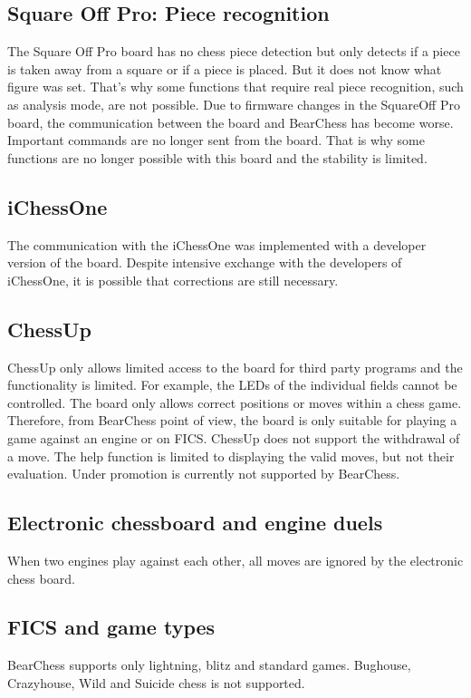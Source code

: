 \documentclass[11pt,a4paper]{article}
\begin{document}
\subsection{Square Off Pro: Piece recognition}
The Square Off Pro board has no chess piece detection but only detects if a piece is taken away from a square or if a piece is placed. But it does not know what figure was set. That's why some functions that require real piece recognition, such as analysis mode, are not possible. Due to firmware changes in the SquareOff Pro board, the communication between the board and BearChess has become worse. Important commands are no longer sent from the board.
That is why some functions are no longer possible with this board and the stability is limited.

\subsection{iChessOne}
The communication with the iChessOne was implemented with a developer version of the board. Despite intensive exchange with the developers of iChessOne, it is possible that corrections are still necessary.

\subsection{ChessUp}
ChessUp only allows limited access to the board for third party programs and the functionality is limited. For example, the LEDs of the individual fields cannot be controlled. The board only allows correct positions or moves within a chess game. Therefore, from BearChess point of view, the board is only suitable for playing a game against an engine or on FICS. ChessUp does not support the withdrawal of a move. The help function is limited to displaying the valid moves, but not their evaluation. Under promotion is currently not supported by BearChess.

\subsection{Electronic chessboard and engine duels}
When two engines play against each other, all moves are ignored by the electronic chess board.

\subsection{FICS and game types}
BearChess supports only lightning, blitz and standard games. Bughouse, Crazyhouse, Wild and Suicide chess is not supported.
\end{document}
